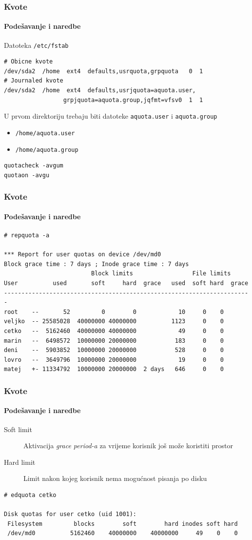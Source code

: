 \documentclass[t]{beamer}
\begin{document}
\begin{frame}[fragile]
	\frametitle{Kvote}
	\framesubtitle{Podešavanje i naredbe}
	Datoteka \texttt{/etc/fstab}
	{\small \begin{verbatim}
# Obicne kvote
/dev/sda2  /home  ext4  defaults,usrquota,grpquota   0  1
# Journaled kvote
/dev/sda2  /home  ext4  defaults,usrjquota=aquota.user,
                 grpjquota=aquota.group,jqfmt=vfsv0  1  1
	\end{verbatim} }
	U prvom direktoriju trebaju biti datoteke \texttt{aquota.user} i \texttt{aquota.group}
	\begin{itemize}
		\item[] \texttt{/home/aquota.user}
		\item[] \texttt{/home/aquota.group}
	\end{itemize}
	\begin{verbatim}
quotacheck -avgum
quotaon -avgu
	\end{verbatim}
\end{frame}

\begin{frame}[fragile]
	\frametitle{Kvote}
	\framesubtitle{Podešavanje i naredbe}
	{\footnotesize \begin{verbatim}
# repquota -a

*** Report for user quotas on device /dev/md0
Block grace time : 7 days ; Inode grace time : 7 days
                         Block limits                 File limits
User          used       soft     hard  grace   used  soft hard  grace
-----------------------------------------------------------------------
root    --       52         0        0            10     0    0
veljko  -- 25585028  40000000 40000000          1123     0    0
cetko   --  5162460  40000000 40000000            49     0    0
marin   --  6498572  10000000 20000000           183     0    0
deni    --  5903852  10000000 20000000           528     0    0
lovro   --  3649796  10000000 20000000            19     0    0
matej   +- 11334792  10000000 20000000  2 days   646     0    0
	\end{verbatim}}
\end{frame}

\begin{frame}[fragile]
	\frametitle{Kvote}
	\framesubtitle{Podešavanje i naredbe}
	\begin{description}
		\item[Soft limit] Aktivacija \emph{grace period-a} za vrijeme korisnik još može koristiti prostor
		\item[Hard limit] Limit nakon kojeg korisnik nema mogućnost pisanja po disku
	\end{description}
	\vspace{1em}
	{\footnotesize \begin{verbatim}
# edquota cetko

Disk quotas for user cetko (uid 1001):
 Filesystem         blocks        soft        hard inodes soft hard
 /dev/md0          5162460    40000000    40000000     49    0    0
	\end{verbatim}}
\end{frame}
\end{document}
